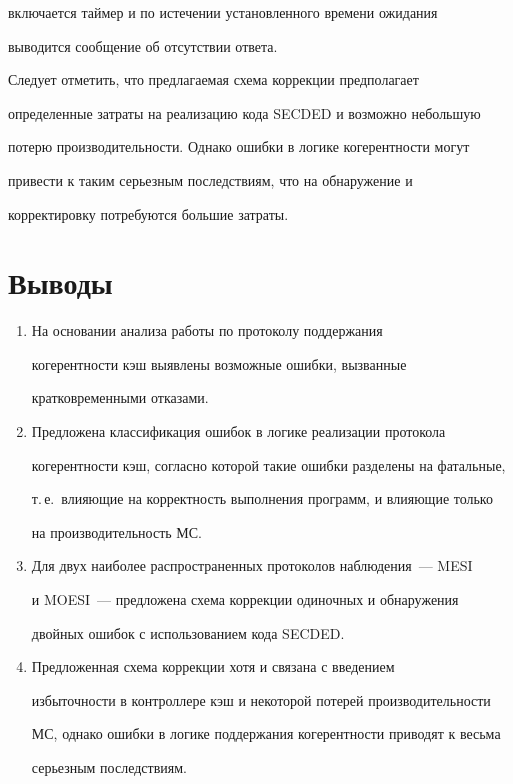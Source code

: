 включается таймер и по истечении установленного времени ожидания 


выводится сообщение об отсутствии ответа. 


      


      Следует отметить, что предлагаемая схема коррекции предполагает 


определенные затраты на реализацию кода SECDED и возможно небольшую 


потерю производительности. Однако ошибки в логике когерентности могут 


привести к таким серьезным последствиям, что на обнаружение и 


корректировку потребуются большие затраты.


\section{Выводы}





\noindent


\begin{enumerate}[1.]


\item На основании анализа работы по протоколу поддержания 


когерентности кэш выявлены возможные ошибки, вызванные 


кратковременными отказами. 


\item Предложена классификация ошибок в логике реализации протокола 


когерентности кэш, согласно которой такие ошибки разделены на фатальные, 


т.\,е.\ влияющие на корректность выполнения программ, и влияющие только 


на производительность МС.


\item Для двух наиболее распространенных протоколов наблюдения~--- MESI 


и MOESI~--- предложена схема коррекции одиночных и обнаружения 


двойных ошибок с использованием кода SECDED.


\item Предложенная схема коррекции хотя и связана с введением 


избыточности в контроллере кэш и некоторой потерей производительности 


МС, однако ошибки в логике поддержания когерентности приводят к весьма 


серьезным последствиям.


\end{enumerate}





